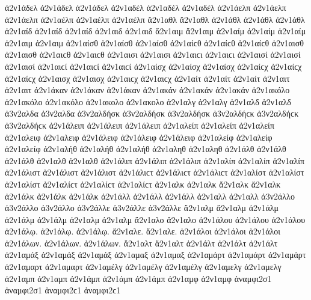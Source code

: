 {ἀ2ν1άδελ ἀ2ν1άδελ ἀ2ν1άδελ   %
ἀ2ν1αδέλ ἀ2ν1αδέλ ἀ2ν1αδέλ 
ἀ2ν1άελπ ἀ2ν1άελπ ἀ2ν1άελπ   %
ἀ2ν1αέλπ ἀ2ν1αέλπ ἀ2ν1αέλπ 
ἄ2ν1αθλ ἄ2ν1αθλ   %
ἀ2ν1άθλ ἀ2ν1άθλ ἀ2ν1άθλ 
ἀ2ν1αίδ ἀ2ν1αίδ ἀ2ν1αίδ   %
ἀ2ν1αιδ ἀ2ν1αιδ   %
ἄ2ν1αιμ ἄ2ν1αιμ   %
ἀ2ν1αίμ ἀ2ν1αίμ ἀ2ν1αίμ 
ἀ2ν1αιμ ἀ2ν1αιμ   %
ἀ2ν1αίσθ ἀ2ν1αίσθ ἀ2ν1αίσθ ἀ2ν1αίϲθ ἀ2ν1αίϲθ ἀ2ν1αίϲθ   %
ἀ2ν1αισθ ἀ2ν1αισθ ἀ2ν1αιϲθ ἀ2ν1αιϲθ 
ἀ2ν1αισι ἀ2ν1αισι ἀ2ν1αιϲι ἀ2ν1αιϲι   %
ἀ2ν1αισί ἀ2ν1αισί ἀ2ν1αισί ἀ2ν1αιϲί ἀ2ν1αιϲί ἀ2ν1αιϲί 
ἀ2ν1αίσχ ἀ2ν1αίσχ ἀ2ν1αίσχ ἀ2ν1αίϲχ ἀ2ν1αίϲχ ἀ2ν1αίϲχ   %
ἀ2ν1αισχ ἀ2ν1αισχ ἀ2ν1αιϲχ ἀ2ν1αιϲχ 
ἀ2ν1αίτ ἀ2ν1αίτ ἀ2ν1αίτ   %
ἀ2ν1αιτ ἀ2ν1αιτ 
ἀ2ν1άκαν ἀ2ν1άκαν ἀ2ν1άκαν   %
ἀ2ν1ακάν ἀ2ν1ακάν ἀ2ν1ακάν 
ἀ2ν1ακόλο ἀ2ν1ακόλο ἀ2ν1ακόλο   %
ἀ2ν1ακολο ἀ2ν1ακολο 
ἀ2ν1αλγ ἀ2ν1αλγ   %
ἀ2ν1αλδ ἀ2ν1αλδ   %
ἀ3ν2αλδα ἀ3ν2αλδα   %
ἀ3ν2αλδήσκ ἀ3ν2αλδήσκ ἀ3ν2αλδήσκ ἀ3ν2αλδήϲκ ἀ3ν2αλδήϲκ ἀ3ν2αλδήϲκ   %
ἀ2ν1άλειπ ἀ2ν1άλειπ ἀ2ν1άλειπ   %
ἀ2ν1αλείπ ἀ2ν1αλείπ ἀ2ν1αλείπ 
ἀ2ν1αλειφ ἀ2ν1αλειφ   %
ἀ2ν1άλειφ ἀ2ν1άλειφ ἀ2ν1άλειφ   %
ἀ2ν1αλείφ ἀ2ν1αλείφ ἀ2ν1αλείφ 
ἀ2ν1αλήθ ἀ2ν1αλήθ ἀ2ν1αλήθ   %
ἀ2ν1αληθ ἀ2ν1αληθ 
ἀ2ν1άλθ ἀ2ν1άλθ ἀ2ν1άλθ   %
ἀ2ν1αλθ ἀ2ν1αλθ 
ἀ2ν1άλιπ ἀ2ν1άλιπ ἀ2ν1άλιπ   %
ἀ2ν1αλίπ ἀ2ν1αλίπ ἀ2ν1αλίπ 
ἀ2ν1άλιστ ἀ2ν1άλιστ ἀ2ν1άλιστ ἀ2ν1άλιϲτ ἀ2ν1άλιϲτ ἀ2ν1άλιϲτ   %
ἀ2ν1αλίστ ἀ2ν1αλίστ ἀ2ν1αλίστ ἀ2ν1αλίϲτ ἀ2ν1αλίϲτ ἀ2ν1αλίϲτ 
ἀ2ν1αλκ ἀ2ν1αλκ   %
ἄ2ν1αλκ ἄ2ν1αλκ   %
ἀ2ν1άλκ ἀ2ν1άλκ ἀ2ν1άλκ 
ἀ2ν1άλλ ἀ2ν1άλλ ἀ2ν1άλλ   %
ἀ2ν1αλλ ἀ2ν1αλλ 
ἀ3ν2άλλο ἀ3ν2άλλο ἀ3ν2άλλο   %
ἀ3ν2άλλε ἀ3ν2άλλε ἀ3ν2άλλε 
ἄ2ν1αλμ ἄ2ν1αλμ   %
ἀ2ν1άλμ ἀ2ν1άλμ ἀ2ν1άλμ   %
ἀ2ν1αλμ ἀ2ν1αλμ 
ἄ2ν1αλο ἄ2ν1αλο   %
ἀ2ν1άλου ἀ2ν1άλου ἀ2ν1άλου 
ἀ2ν1άλῳ. ἀ2ν1άλῳ. ἀ2ν1άλῳ. 
ἄ2ν1αλε. ἄ2ν1αλε. 
ἀ2ν1άλοι ἀ2ν1άλοι ἀ2ν1άλοι 
ἀ2ν1άλων. ἀ2ν1άλων. ἀ2ν1άλων. 
ἄ2ν1αλτ ἄ2ν1αλτ   %
ἀ2ν1άλτ ἀ2ν1άλτ ἀ2ν1άλτ 
ἀ2ν1αμάξ ἀ2ν1αμάξ ἀ2ν1αμάξ   %
ἀ2ν1αμαξ ἀ2ν1αμαξ 
ἀ2ν1αμάρτ ἀ2ν1αμάρτ ἀ2ν1αμάρτ   %
ἀ2ν1αμαρτ ἀ2ν1αμαρτ 
ἀ2ν1αμέλγ ἀ2ν1αμέλγ ἀ2ν1αμέλγ   %
ἀ2ν1αμελγ ἀ2ν1αμελγ 
ἀ2ν1αμπ ἀ2ν1αμπ   %
ἀ2ν1άμπ ἀ2ν1άμπ ἀ2ν1άμπ   %
ἀ2ν1αμφ ἀ2ν1αμφ   %
ἀναμφι2σ1 ἀναμφι2σ1 ἀναμφι2ϲ1 ἀναμφι2ϲ1   %
}
